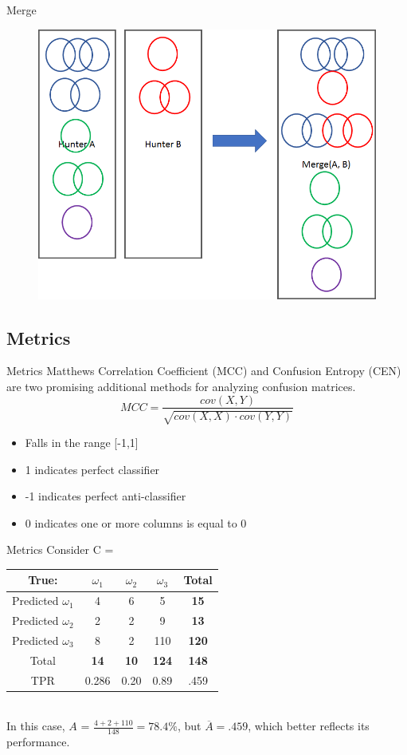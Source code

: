 \documentclass{beamer}
\begin{document}
\begin{frame}{Merge}
	
	\begin{figure}
		\centering
		\includegraphics[width=0.7\linewidth]{figures/png/HunterMerge}
		
		\label{fig:huntermerge}
	\end{figure}
\end{frame}


\subsection{Metrics}
\begin{frame}{Metrics}
	Matthews Correlation Coefficient (MCC) and Confusion Entropy (CEN) are two promising additional methods for analyzing confusion matrices.
	$$MCC = \frac{cov(X,Y)}{\sqrt{cov(X,X)\cdot cov(Y,Y)}}$$
	\begin{itemize}
		\item Falls in the range  [-1,1]
		\item 1 indicates perfect classifier
		\item -1 indicates perfect anti-classifier
		\item 0 indicates one or more columns is equal to 0
	\end{itemize}
\end{frame}
\begin{frame}{Metrics}
	Consider C = \\\begin{tabular}{|c|c|c|c|c|}
		\hline
		True:&$\omega_1$&$\omega_2$&$\omega_3$&\textbf{Total}\\
		\hline
		Predicted $\omega_1$&4&6&5&\textbf{15}\\
		\hline
		Predicted $\omega_2$&2&2&9&\textbf{13}\\
		\hline
		Predicted $\omega_3$&8&2&110&\textbf{120}\\
		\hline
		Total&\textbf{14}&\textbf{10}&\textbf{124}&\textbf{148}\\
		TPR&0.286&0.20&0.89&.459\\
		\hline
	\end{tabular} 
	\\In this case, $A$ = $\frac{4+2+110}{148} = 78.4\%$, but $\overline{A} = .459$, which better reflects its performance. 
\end{frame}
\end{document}
